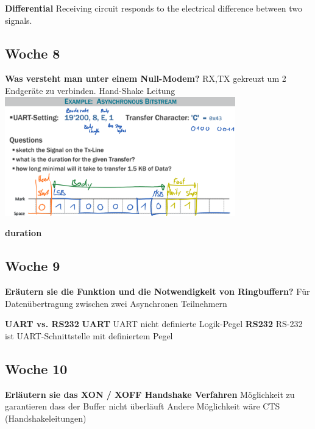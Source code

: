 \qquad \textbf{Differential}\newline
    Receiving circuit responds to the electrical difference between two signals.
\clearpage
\subsection*{Woche 8}
\textbf{Was versteht man unter einem Null-Modem?}\newline
     RX,TX gekreuzt um 2 Endgeräte zu verbinden. Hand-Shake Leitung\\
     \includegraphics[width=10cm]{images/FragenUart}\newline
     
     \textbf{duration}\newline   
     
\subsection*{Woche 9}
\textbf{Eräutern sie die Funktion und die Notwendigkeit von Ringbuffern?}\newline
    Für Datenübertragung zwischen zwei Asynchronen Teilnehmern\newline

\textbf{UART vs. RS232}\newline
\null\qquad \textbf{UART}\newline
    UART nicht definierte Logik-Pegel\newline
\null\qquad \textbf{RS232}\newline
    RS-232 ist UART-Schnittstelle mit definiertem Pegel
    
\subsection*{Woche 10}
\textbf{Erläutern sie das XON / XOFF Handshake Verfahren}\newline
    Möglichkeit zu garantieren dass der Buffer nicht überläuft\newline
    Andere Möglichkeit wäre CTS (Handshakeleitungen)\newline
    
